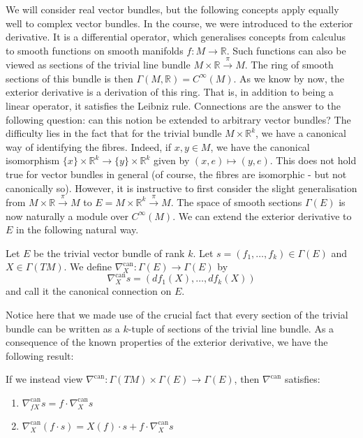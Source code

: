 We will consider real vector bundles, but the following concepts apply equally well to complex vector bundles. In the course, we were introduced to the exterior derivative. It is a differential operator, which generalises concepts from calculus to smooth functions on smooth manifolds $f:M\to\mathbb{R}$. Such functions can also be viewed as sections of the trivial line bundle $M\times\mathbb{R}\xrightarrow{\pi}M$. The ring of smooth sections of this bundle is then $\Gamma(M,\mathbb{R})=C^\infty(M)$. As we know by now, the exterior derivative is a derivation of this ring. That is, in addition to being a linear operator, it satisfies the Leibniz rule. Connections are the answer to the following question: can this notion be extended to arbitrary vector bundles? The difficulty lies in the fact that for the trivial bundle $M\times\mathbb{R}^k$, we have a canonical way of identifying the fibres. Indeed, if $x,y\in M$, we have the canonical isomorphism $\{x\}\times\mathbb{R}^k\to\{y\}\times\mathbb{R}^k$ given by $(x,e)\mapsto (y,e)$. This does not hold true for vector bundles in general (of course, the fibres are isomorphic - but not canonically so). However, it is instructive to first consider the slight generalisation from $M\times\mathbb{R}\xrightarrow{\pi}M$ to $E=M\times\mathbb{R}^k\xrightarrow{\pi}M$. The space of smooth sections $\Gamma(E)$ is now naturally a module over $C^\infty(M)$. We can extend the exterior derivative to $E$ in the following natural way.
\begin{definition}
  Let $E$ be the trivial vector bundle of rank $k$. Let $s=(f_1,\dots,f_k)\in\Gamma(E)$ and $X\in\Gamma(TM)$. We define $\nabla^\text{can}_X:\Gamma(E)\to\Gamma(E)$ by $$\nabla^\text{can}_Xs=(df_1(X),\dots,df_k(X))$$
  and call it the canonical connection on $E$.
\end{definition}
Notice here that we made use of the crucial fact that every section of the trivial bundle can be written as a $k$-tuple of sections of the trivial line bundle. As a consequence of the known properties of the exterior derivative, we have the following result:
\begin{proposition}
  If we instead view $\nabla^\text{can}:\Gamma(TM)\times\Gamma(E)\to\Gamma(E)$, then $\nabla^\text{can}$ satisfies:
  \begin{enumerate}
    \item $\nabla_{fX}^\text{can}s=f\cdot\nabla^\text{can}_Xs$
    \item $\nabla^\text{can}_X(f\cdot s)=X(f)\cdot s+f\cdot\nabla^\text{can}_Xs$
  \end{enumerate}
\end{proposition}
